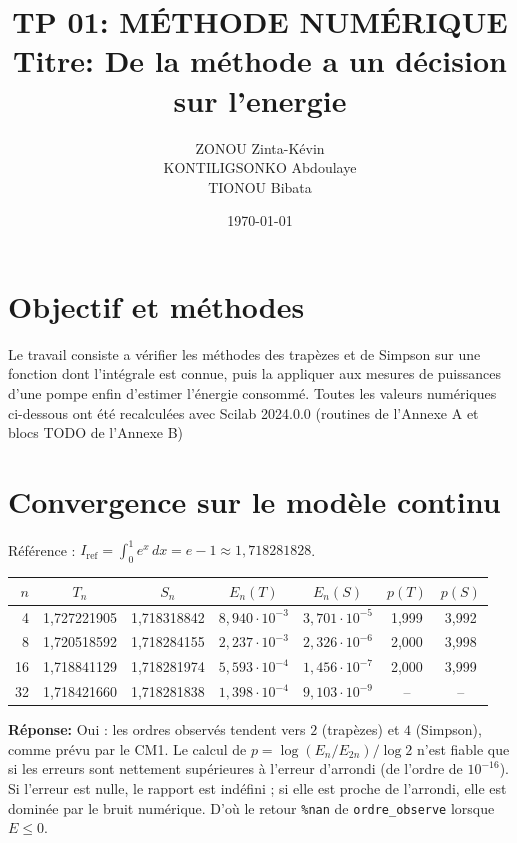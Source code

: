 \documentclass[12pt, a4paper]{article}
\title{TP 01: MÉTHODE NUMÉRIQUE\\Titre: De la méthode a un décision sur l'energie}
\author{ZONOU Zinta-Kévin\\KONTILIGSONKO Abdoulaye\\TIONOU Bibata}
\date{\today}
\begin{document}
\maketitle

\section{Objectif et méthodes}
Le travail consiste a vérifier les méthodes des trapèzes et de Simpson sur une fonction dont l'intégrale est connue, puis la appliquer aux mesures de puissances d'une pompe enfin d'estimer l'énergie consommé. Toutes les valeurs numériques ci-dessous ont été recalculées avec Scilab 2024.0.0 (routines de l'Annexe A et blocs TODO de l'Annexe B)
\section{Convergence sur le modèle continu}

Référence : $I_{\mathrm{ref}}=\displaystyle\int_0^1 e^x\,dx=e-1\approx 1{,}718281828$.

\begin{center}
\small
\begin{tabular}{|r|c|c|c|c|c|c|}
\hline
$n$ & $T_n$ & $S_n$ & $E_n(T)$ & $E_n(S)$ & $p(T)$ & $p(S)$\\
\hline
4  & 1,727221905 & 1,718318842 & $8{,}940\cdot10^{-3}$ & $3{,}701\cdot10^{-5}$ & 1,999 & 3,992\\
8  & 1,720518592 & 1,718284155 & $2{,}237\cdot10^{-3}$ & $2{,}326\cdot10^{-6}$ & 2,000 & 3,998\\
16 & 1,718841129 & 1,718281974 & $5{,}593\cdot10^{-4}$ & $1{,}456\cdot10^{-7}$ & 2,000 & 3,999\\
32 & 1,718421660 & 1,718281838 & $1{,}398\cdot10^{-4}$ & $9{,}103\cdot10^{-9}$ & -- & --\\
\hline
\end{tabular}
\end{center}

\noindent\textbf{Réponse:} Oui : les ordres observés tendent vers $2$ (trapèzes) et $4$ (Simpson), comme prévu par le CM1.
Le calcul de $p=\log(E_n/E_{2n})/\log 2$ n'est fiable que si les erreurs sont nettement supérieures à l'erreur d'arrondi (de l'ordre de $10^{-16}$). Si l'erreur est nulle, le rapport est indéfini ; si elle est proche de l'arrondi, elle est dominée par le bruit numérique. D'où le retour \texttt{\%nan} de \texttt{ordre\_observe} lorsque $E\le 0$.
\end{document}
